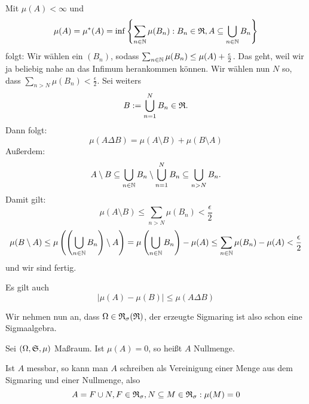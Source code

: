 			\begin{bew}
				Mit $\mu(A)<\infty$ und
				\[ \mu(A)=\mu^*(A)=\inf\left\{\sum_{n\in\mathbb{N}}\mu(B_n): B_n\in\mathfrak{R}, A\subseteq \bigcup_{n\in\mathbb{N}} B_n\right\} \]
				folgt: Wir wählen ein $(B_n)$, sodass $\sum_{n\in\mathbb{N}} \mu(B_n)\le \mu(A)+\frac{\epsilon}{2}$. Das geht, weil wir ja beliebig nahe an das Infimum herankommen können. Wir wählen nun $N$ so, dass $\sum_{n>N}\mu(B_n)<\frac{\epsilon}{2}$. Sei weiters
				\[ B:=\bigcup_{n=1}^N B_n\in\mathfrak{R}. \]
				Dann folgt:
				\[ \mu(A\Delta B)=\mu (A\setminus B)+\mu(B\setminus A) \]
				Außerdem:
				\[ A\setminus B\subseteq\bigcup_{n\in\mathbb{N}} B_n\setminus \bigcup_{n=1}^N B_n\subseteq \bigcup_{n>N}B_n. \]
				Damit gilt:
				\[ \mu(A\setminus B)\le\sum_{n>N} \mu(B_n)<\frac{\epsilon}{2} \]
				\[ \mu(B\setminus A)\le \mu\left(\left(\bigcup_{n\in\mathbb{N}} B_n\right)\setminus A\right)=\mu\left(\bigcup_{n\in\mathbb{N}} B_n\right)-\mu(A)\le \sum_{n\in\mathbb{N}} \mu(B_n)-\mu(A)<\frac{\epsilon}{2} \]
				und wir sind fertig. 
			\end{bew}
			
			\begin{bem}
				Es gilt auch 
				\[ |\mu(A)-\mu(B)|\le \mu(A\Delta B) \]
			\end{bem}
			
			\begin{bem}
				Wir nehmen nun an, dass $\Omega\in\mathfrak{R}_\sigma(\mathfrak{R})$, der erzeugte Sigmaring ist also schon eine Sigmaalgebra. 
			\end{bem}
			
			
			\begin{defi}
				Sei $(\Omega, \mathfrak{S}, \mu)$ Maßraum. Ist $\mu(A)=0$, so heißt $A$ Nullmenge.
				
			\end{defi}
			
			\begin{satz}
				Ist $A$ messbar, so kann man $A$ schreiben als Vereinigung einer Menge aus dem Sigmaring und einer Nullmenge, also
				\[ A=F\cup N, F\in\mathfrak{R}_\sigma, N\subseteq M\in\mathfrak{R}_\sigma:\mu(M)=0 \]
			\end{satz}
			
